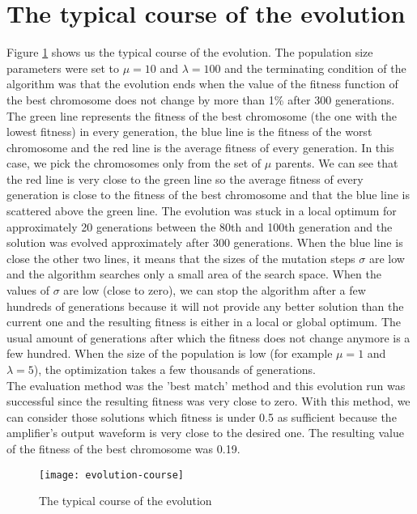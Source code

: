 \section{The typical course of the evolution}
Figure \ref{evolution-course} shows us the typical course of the evolution. The population size parameters were set to $\mu = 10$ and $\lambda = 100$ and the terminating condition of the algorithm was that the evolution ends when the value of the fitness function of the best chromosome does not change by more than 1\% after 300 generations.\\
The green line represents the fitness of the best chromosome (the one with the lowest fitness) in every generation, the blue line is the fitness of the worst chromosome and the red line is the average fitness of every generation. In this case, we pick the chromosomes only from the set of $\mu$ parents. We can see that the red line is very close to the green line so the average fitness of every generation is close to the fitness of the best chromosome and that the blue line is scattered above the green line. The evolution was stuck in a local optimum for approximately 20 generations between the 80th and 100th generation and the solution was evolved approximately after 300 generations. When the blue line is close the other two lines, it means that the sizes of the mutation steps $\sigma$ are low and the algorithm searches only a small area of the search space. When the values of $\sigma$ are low (close to zero), we can stop the algorithm after a few hundreds of generations because it will not provide any better solution than the current one and the resulting fitness is either in a local or global optimum. The usual amount of generations after which the fitness does not change anymore is a few hundred. When the size of the population is low (for example $\mu = 1$ and $\lambda = 5$), the optimization takes a few thousands of generations.\\
The evaluation method was the 'best match' method and this evolution run was successful since the resulting fitness was very close to zero. With this method, we can consider those solutions which fitness is under 0.5 as sufficient because the amplifier's output waveform is very close to the desired one. The resulting value of the fitness of the best chromosome was 0.19.

\begin{figure}[H]
    \centerline{\texttt{[image: evolution-course]}\label{evolution-course}}
    \caption{The typical course of the evolution}
\end{figure}

